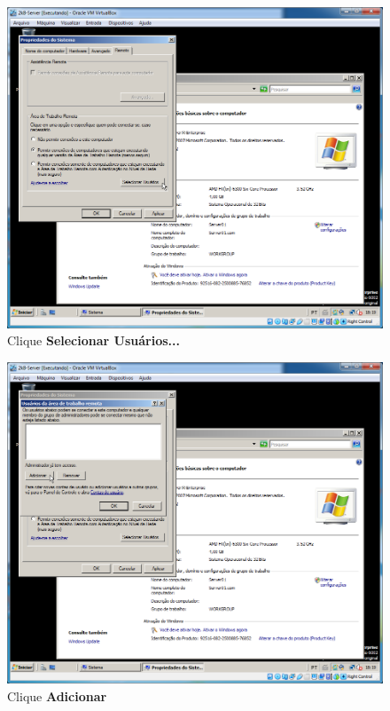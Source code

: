 \documentclass[10pt]{article}
\begin{document}
\begin{figure}[H]
    \centering
    \caption{Clique \textbf{Selecionar Usuários...}}
    \label{fig:ar015}
    \includegraphics[width=\linewidth]{images/acesso_remoto/ar015.png}
\end{figure}
\begin{figure}[H]
    \centering
    \caption{Clique \textbf{Adicionar}}
    \label{fig:ar016}
    \includegraphics[width=\linewidth]{images/acesso_remoto/ar016.png}
\end{figure}
\end{document}
